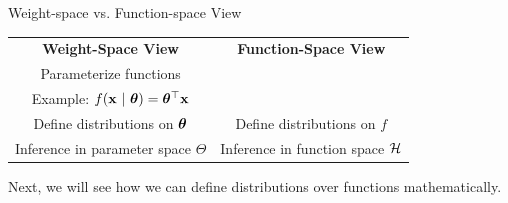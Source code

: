 \documentclass[11pt,compress,t,notes=noshow, xcolor=table]{beamer}
\begin{document}
\begin{frame}{Weight-space vs. Function-space View}

\begin{table}
  \begin{tabular}{cc}
  \textbf{Weight-Space View} & \textbf{Function-Space View} \vspace{4mm}\\ 
  Parameterize functions & \vspace{1mm}\\
  \footnotesize Example: $f(\mathbf{x} ~|~ \bm{\theta}) = \bm{\theta}^\top \mathbf{x}$ & \vspace{3mm}\\
  Define distributions on $\bm{\theta}$ & Define distributions on $f$ \vspace{4mm}\\
  Inference in parameter space $\Theta$ & Inference in function space $\mathcal{H}$
  \end{tabular}
\end{table}  

\lz

Next, we will see how we can define distributions over functions mathematically. 


\end{frame}









\endlecture
\end{document}
